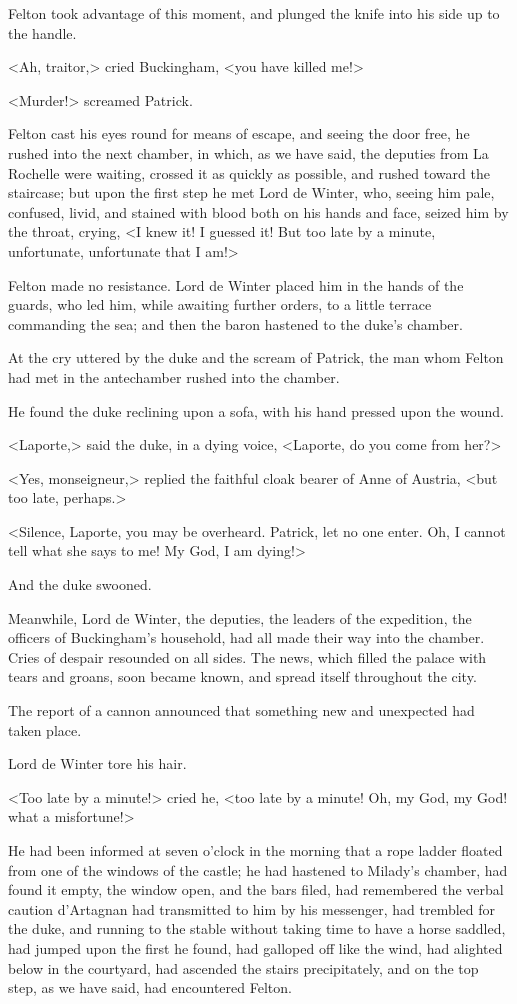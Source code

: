 Felton took advantage of this moment, and plunged the knife into his side up to the handle. 

<Ah, traitor,> cried Buckingham, <you have killed me!> 

<Murder!> screamed Patrick. 

Felton cast his eyes round for means of escape, and seeing the door free, he rushed into the next chamber, in which, as we have said, the deputies from La Rochelle were waiting, crossed it as quickly as possible, and rushed toward the staircase; but upon the first step he met Lord de Winter, who, seeing him pale, confused, livid, and stained with blood both on his hands and face, seized him by the throat, crying, <I knew it! I guessed it! But too late by a minute, unfortunate, unfortunate that I am!> 

Felton made no resistance. Lord de Winter placed him in the hands of the guards, who led him, while awaiting further orders, to a little terrace commanding the sea; and then the baron hastened to the duke's chamber. 

At the cry uttered by the duke and the scream of Patrick, the man whom Felton had met in the antechamber rushed into the chamber. 

He found the duke reclining upon a sofa, with his hand pressed upon the wound. 

<Laporte,> said the duke, in a dying voice, <Laporte, do you come from her?> 

<Yes, monseigneur,> replied the faithful cloak bearer of Anne of Austria, <but too late, perhaps.> 

<Silence, Laporte, you may be overheard. Patrick, let no one enter. Oh, I cannot tell what she says to me! My God, I am dying!> 

And the duke swooned. 

Meanwhile, Lord de Winter, the deputies, the leaders of the expedition, the officers of Buckingham's household, had all made their way into the chamber. Cries of despair resounded on all sides. The news, which filled the palace with tears and groans, soon became known, and spread itself throughout the city. 

The report of a cannon announced that something new and unexpected had taken place. 

Lord de Winter tore his hair. 

<Too late by a minute!> cried he, <too late by a minute! Oh, my God, my God! what a misfortune!> 

He had been informed at seven o'clock in the morning that a rope ladder floated from one of the windows of the castle; he had hastened to Milady's chamber, had found it empty, the window open, and the bars filed, had remembered the verbal caution d'Artagnan had transmitted to him by his messenger, had trembled for the duke, and running to the stable without taking time to have a horse saddled, had jumped upon the first he found, had galloped off like the wind, had alighted below in the courtyard, had ascended the stairs precipitately, and on the top step, as we have said, had encountered Felton. 

